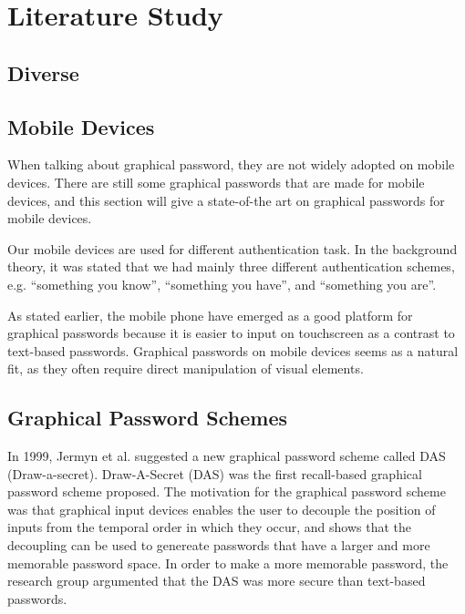 
\chapter{Literature Study}

  \section{Diverse}

    

  \section{Mobile Devices}

  When talking about graphical password, they are not widely adopted on mobile devices. There are still some graphical passwords that are made for mobile devices, and this section will give a state-of-the art on graphical passwords for mobile devices.

  Our mobile devices are used for different authentication task. In the background theory, it was stated that we had mainly three different authentication schemes, e.g. ``something you know'', ``something you have'', and ``something you are''.

  As stated earlier, the mobile phone have emerged as a good platform for graphical passwords because it is easier to input on touchscreen as a contrast to text-based passwords. Graphical passwords on mobile devices seems as a natural fit, as they often require direct manipulation of visual elements. 

  \section{Graphical Password Schemes}

    In 1999, Jermyn et al. \cite{Jermyn} suggested a new graphical password scheme called DAS (Draw-a-secret). Draw-A-Secret (DAS) was the first recall-based graphical password scheme proposed. The motivation for the graphical password scheme was that graphical input devices enables the user to decouple the position of inputs from the temporal order in which they occur, and shows that the decoupling can be used to genereate passwords that have a larger and more memorable password space. In order to make a more memorable password, the research group argumented that the DAS was more secure than text-based passwords. 

